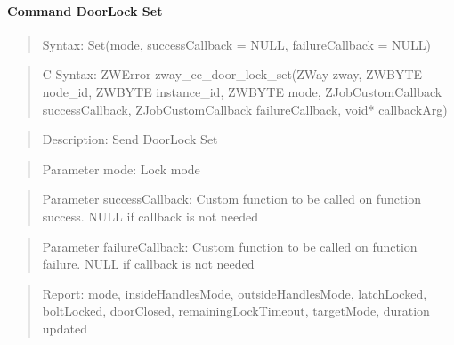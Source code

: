 \paragraph{Command DoorLock Set}
\begin{quote}Syntax: Set(mode, successCallback = NULL, failureCallback = NULL)\end{quote}
\begin{quote}C Syntax: ZWError zway\_cc\_door\_lock\_set(ZWay zway, ZWBYTE node\_id, ZWBYTE instance\_id, ZWBYTE mode, ZJobCustomCallback successCallback, ZJobCustomCallback failureCallback, void* callbackArg)\end{quote}
\begin{quote}Description: Send DoorLock Set\end{quote}
\begin{quote}Parameter mode: Lock mode\end{quote}
\begin{quote}Parameter successCallback: Custom function to be called on function success. NULL if callback is not needed\end{quote}
\begin{quote}Parameter failureCallback: Custom function to be called on function failure. NULL if callback is not needed\end{quote}
\begin{quote}Report: mode, insideHandlesMode, outsideHandlesMode, latchLocked, boltLocked, doorClosed, remainingLockTimeout, targetMode, duration updated\end{quote}


